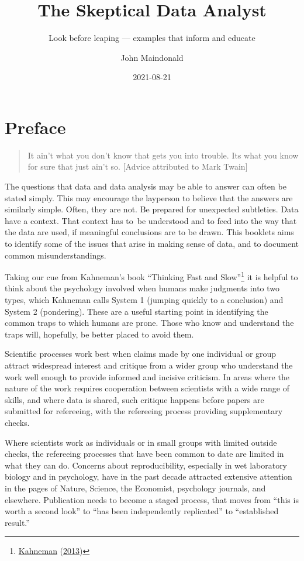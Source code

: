 \documentclass[
  10pt,
  b5paper]{book}
\title{The Skeptical Data Analyst}
\subtitle{Look before leaping --- examples that inform and educate}
\author{John Maindonald}
\date{2021-08-21}
\begin{document}
\maketitle

{
\hypersetup{linkcolor=}
\setcounter{tocdepth}{1}
\tableofcontents
}
\renewcommand{\bibname}{References}

\hypertarget{preface}{%
\chapter*{Preface}\label{preface}}

\begin{quote}
It ain't what you don't know that gets you into trouble.
Its what you know for sure that just ain't so.
{[}Advice attributed to Mark Twain{]}
\end{quote}

The questions that data and data analysis may be able to answer can
often be stated simply. This may encourage the layperson to believe
that the answers are similarly simple. Often, they are not. Be
prepared for unexpected subtleties. Data have a context. That context
has to~be understood and to feed into the way that the data are used,
if meaningful conclusions are to be drawn. This booklets aims to
identify some of the issues that arise in making sense of data,
and to document common misunderstandings.

Taking our cue from Kahneman's book ``Thinking Fast and Slow''\footnote{\protect\hyperlink{ref-kahneman_2013}{Kahneman} (\protect\hyperlink{ref-kahneman_2013}{2013})}
it is helpful to think about the psychology involved when
humans make judgments into two types, which Kahneman calls System 1
(jumping quickly to a conclusion) and System 2 (pondering).
These are a useful starting point in identifying the common traps
to which humans are prone. Those who know and understand the traps
will, hopefully, be better placed to avoid them.

Scientific processes work best when claims made by one individual
or group attract widespread interest and critique from a wider group
who understand the work well enough to provide informed and incisive
criticism. In areas where the nature of the work requires
cooperation between scientists with a wide range of skills, and
where data is shared, such critique happens before papers are
submitted for refereeing, with the refereeing process providing
supplementary checks.

Where scientists work as individuals or in small groups with
limited outside checks, the refereeing processes that have been
common to date are limited in what they can do. Concerns about
reproducibility, especially in wet laboratory biology and in psychology,
have in the past decade attracted extensive attention in the pages of
Nature, Science, the Economist, psychology journals, and elsewhere.
Publication needs to become a staged process, that moves from
``this is worth a second look'' to ``has been independently replicated''
to ``established result.''
\end{document}
